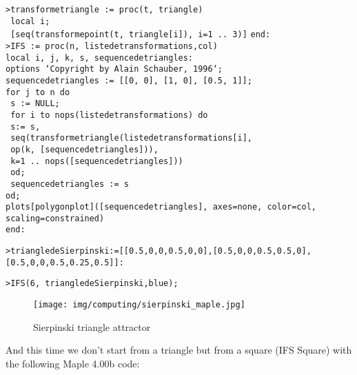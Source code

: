 	\texttt{>transforme\textunderscore triangle := proc(t, triangle)}\\	
    \texttt{   local i;}\\
    \texttt{   [seq(transforme\textunderscore point(t, triangle[i]), i=1 .. 3)]}    
	\texttt{end:}\\

	\texttt{>IFS := proc(n, liste\textunderscore de\textunderscore transformations,col)}\\
     \texttt{local i, j, k, s, sequence\textunderscore de\textunderscore triangles:}\\
     \texttt{options `Copyright by Alain Schauber, 1996`;}\\
     \texttt{sequence\textunderscore de\textunderscore triangles := [[0, 0], [1, 0], [0.5, 1]];}\\
     \texttt{for j to n do}\\
     \texttt{   s := NULL;}\\   
     \texttt{   for i to nops(liste\textunderscore de\textunderscore transformations) do}\\
        \texttt{   {} {} {} s:= s,}\\
        \texttt{   {} {} {} seq(transforme\textunderscore triangle(liste\textunderscore de\textunderscore transformations[i],}\\
        \texttt{   {} {} {} op(k, [sequence\textunderscore de\textunderscore triangles])),}\\
        \texttt{   {} {} {} k=1 .. nops([sequence\textunderscore de\textunderscore triangles]))}\\
       \texttt{   {} {} {} od;}\\       
      \texttt{   {} {} {} sequence\textunderscore de\textunderscore triangles := s}\\
    \texttt{od;}\\
    \texttt{plots[polygonplot]([sequence\textunderscore de\textunderscore triangles], axes=none, color=col, scaling=constrained)}\\
  	\texttt{end:}
  	
	\texttt{>triangle\textunderscore de\textunderscore  Sierpinski:=[[0.5,0,0,0.5,0,0],[0.5,0,0,0.5,0.5,0], [0.5,0,0,0.5,0.25,0.5]]:}

	\texttt{>IFS(6, triangle\textunderscore de\textunderscore Sierpinski,blue);}
	\begin{figure}[H]
		\centering
		\texttt{[image: img/computing/sierpinski\_maple.jpg]}
		\caption{Sierpinski triangle attractor}
	\end{figure}
	And this time we don't start from a triangle but from a square (IFS Square) with the following Maple 4.00b code:
	
